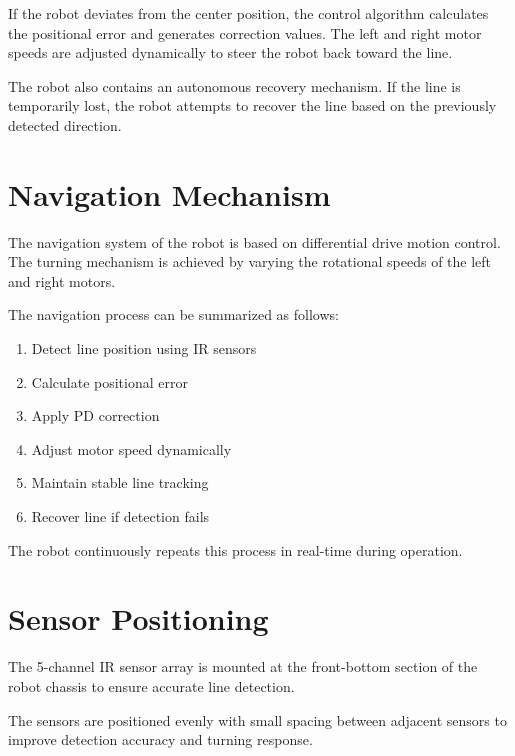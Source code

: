 \documentclass[12pt,a4paper,oneside]{report}
\begin{document}
If the robot deviates from the center position, the control algorithm calculates the positional error and generates correction values. The left and right motor speeds are adjusted dynamically to steer the robot back toward the line.

The robot also contains an autonomous recovery mechanism. If the line is temporarily lost, the robot attempts to recover the line based on the previously detected direction.


\section{Navigation Mechanism}

The navigation system of the robot is based on differential drive motion control. The turning mechanism is achieved by varying the rotational speeds of the left and right motors.

The navigation process can be summarized as follows:

\begin{enumerate}
\item Detect line position using IR sensors
\item Calculate positional error
\item Apply PD correction
\item Adjust motor speed dynamically
\item Maintain stable line tracking
\item Recover line if detection fails
\end{enumerate}

The robot continuously repeats this process in real-time during operation.


\section{Sensor Positioning}

The 5-channel IR sensor array is mounted at the front-bottom section of the robot chassis to ensure accurate line detection.

The sensors are positioned evenly with small spacing between adjacent sensors to improve detection accuracy and turning response.
\end{document}
